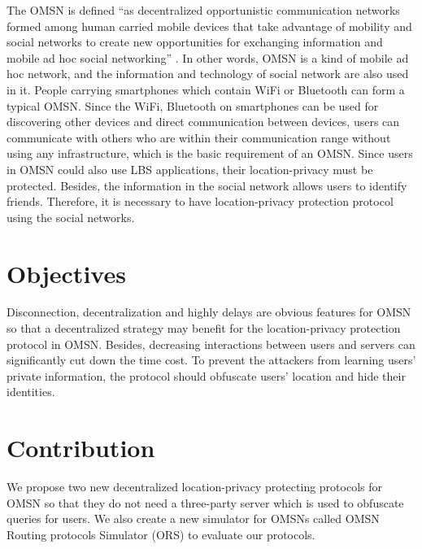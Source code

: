 The OMSN is defined ``as decentralized opportunistic communication networks formed among human carried mobile devices that take advantage of mobility and social networks to create new opportunities for exchanging information and mobile ad hoc social networking'' \cite {C2}. In other words, OMSN is a kind of mobile ad hoc network, and the information and technology of social network are also used in it. People carrying smartphones which contain WiFi or Bluetooth can form a typical OMSN. Since the WiFi, Bluetooth on smartphones can be used for discovering other devices and direct communication between devices, users can communicate with others who are within their communication range without using any infrastructure, which is the basic requirement of an OMSN. Since users in OMSN could also use LBS applications, their location-privacy must be protected. Besides, the information in the social network allows users to identify friends. Therefore, it is necessary to have location-privacy protection protocol using the social networks.


\section{ Objectives}

\noindent Disconnection, decentralization and highly delays are obvious features for OMSN so that a decentralized strategy may benefit for the location-privacy protection protocol in OMSN. Besides, decreasing interactions between users and servers can significantly cut down the time cost. To prevent the attackers from learning users' private information, the protocol should obfuscate users' location and hide their identities.


\section{ Contribution}

\noindent We propose two new decentralized location-privacy protecting protocols for OMSN so that they do not need a three-party server which is used to obfuscate queries for users. We also create a new simulator for OMSNs called OMSN Routing protocols Simulator (ORS) to evaluate our protocols.


